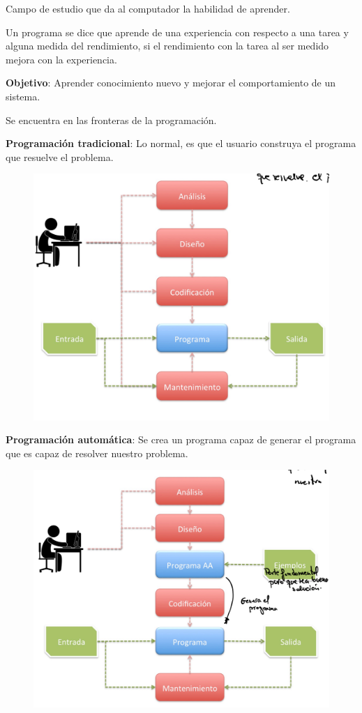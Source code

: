 \documentclass[12pt]{report} %
\begin{document}
Campo de estudio que da al computador la habilidad de aprender.

Un programa se dice que aprende de una experiencia con respecto a una
tarea y alguna medida del rendimiento, si el rendimiento con la tarea al
ser medido mejora con la experiencia.

\textbf{Objetivo}: Aprender conocimiento nuevo y mejorar el
comportamiento de un sistema.

Se encuentra en las fronteras de la programación.

\textbf{Programación tradicional}: Lo normal, es que el usuario
construya el programa que resuelve el problema.

\begin{figure}[H]
	{\includegraphics[scale=.15]{Untitled.png}}
\end{figure}

\textbf{Programación automática}: Se crea un programa capaz de generar
el programa que es capaz de resolver nuestro problema.

\begin{figure}[H]
	{\includegraphics[scale=.15]{Untitled 1.png}}
\end{figure}
\end{document}
